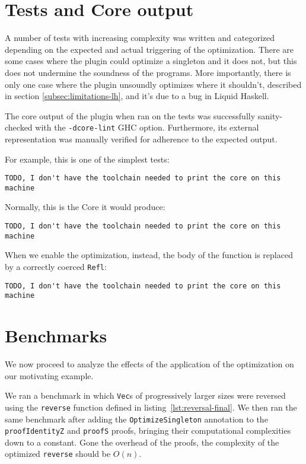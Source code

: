 \section{Tests and Core output}
\label{sec:tests}

A number of tests with increasing complexity was written and categorized depending on the expected and actual triggering of the optimization.
There are some cases where the plugin could optimize a singleton and it does not, but this does not undermine the soundness of the programs.
More importantly, there is only one case where the plugin unsoundly optimizes where it shouldn't, described in section \ref{subsec:limitations-lh}, and it's due to a bug in Liquid Haskell.

The core output of the plugin when ran on the tests was successfully sanity-checked with the \texttt{-dcore-lint} GHC option.
Furthermore, its external representation\cite{core-external-representation} was manually verified for adherence to the expected output.

For example, this is one of the simplest tests:

\begin{lstlisting}
TODO, I don't have the toolchain needed to print the core on this machine
\end{lstlisting}

Normally, this is the Core it would produce:

\begin{lstlisting}
TODO, I don't have the toolchain needed to print the core on this machine
\end{lstlisting}

When we enable the optimization, instead, the body of the function is replaced by a correctly coerced \texttt{Refl}:

\begin{lstlisting}
TODO, I don't have the toolchain needed to print the core on this machine
\end{lstlisting}

\section{Benchmarks}
\label{sec:benchmarks}

We now proceed to analyze the effects of the application of the optimization on our motivating example.

We ran a benchmark in which \texttt{Vec}s of progressively larger sizes were reversed using the \texttt{reverse} function defined in listing~\ref{lst:reversal-final}.
We then ran the same benchmark after adding the \texttt{OptimizeSingleton} annotation to the \texttt{proofIdentityZ} and \texttt{proofS} proofs, bringing their computational complexities down to a constant.
Gone the overhead of the proofs, the complexity of the optimized \texttt{reverse} should be $O(n)$.

